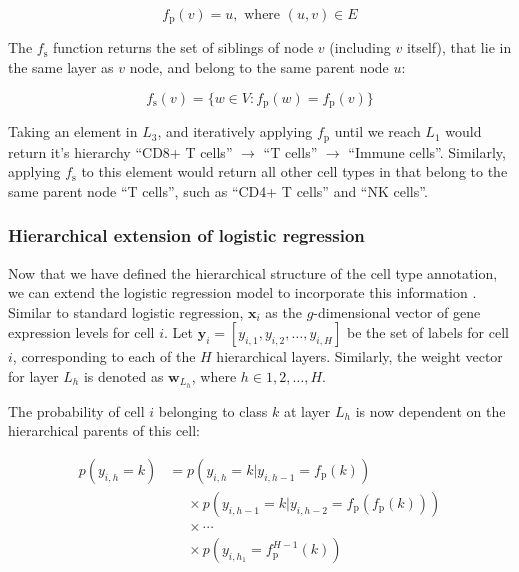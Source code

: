 \begin{equation}
    f_{\text{p}}(v) = u, \text{ where } (u, v) \in E
\end{equation}

The $f_{\text{s}}$ function  returns the set of siblings of node $v$ (including $v$ itself), that lie in the same layer as $v$ node, and belong to the same parent node $u$:

\begin{equation}
    f_{\text{s}}(v) = \{w \in V : f_{\text{p}}(w) = f_{\text{p}}(v)\}
\end{equation}

Taking an element in $L_3$, and iteratively applying $f_{\text{p}}$ until we reach $L_1$  would return it's hierarchy ``CD8+ T cells'' $\rightarrow$ ``T cells'' $\rightarrow$ ``Immune cells''. Similarly, applying $f_{\text{s}}$ to this element would return all other cell types in that belong to the same parent node ``T cells'', such as ``CD4+ T cells'' and ``NK cells''.

\subsubsection*{Hierarchical extension of logistic regression}

Now that we have defined the hierarchical structure of the cell type annotation, we can extend the logistic regression model to incorporate this information . Similar to standard logistic regression, $\mathbf{x}_i$ as the $g$-dimensional vector of gene expression levels for cell $i$. Let $\mathbf{y}_i = [y_{i,1}, y_{i,2}, \ldots, y_{i,H}]$ be the set of labels for cell $i$, corresponding to each of the $H$ hierarchical layers. Similarly, the weight vector for layer $L_h$ is denoted as $\mathbf{w}_{L_h}$, where $h \in {1, 2, \ldots, H}$.

The probability of cell $i$ belonging to class $k$ at layer $L_h$ is now dependent on the hierarchical parents of this cell:

\begin{equation}
    \begin{aligned}
    p(y_{i,h} = k) &= p(y_{i,h} = k | y_{i,h-1} = f_{\text{p}}(k)) \\
    &\phantom{=} \times p(y_{i,h-1} = k | y_{i,h-2} = f_{\text{p}}(f_{\text{p}}(k))) \\
    &\phantom{=} \times \cdots \\
    &\phantom{=} \times p(y_{i,h_1} = f_{\text{p}}^{H-1}(k))
    \end{aligned}
\end{equation}

